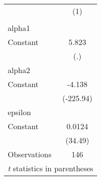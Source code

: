 \begin{tabular}{l*{1}{c}}
\hline\hline
                    &\multicolumn{1}{c}{(1)}\\
                    &\multicolumn{1}{c}{}\\
\hline
alpha1              &            \\
Constant            &       5.823\\
                    &         (.)\\
\hline
alpha2              &            \\
Constant            &      -4.138\\
                    &   (-225.94)\\
\hline
epsilon             &            \\
Constant            &      0.0124\\
                    &     (34.49)\\
\hline
Observations        &         146\\
\hline\hline
\multicolumn{2}{l}{\footnotesize \textit{t} statistics in parentheses}\\
\end{tabular}
